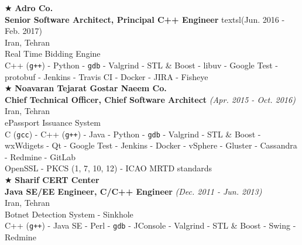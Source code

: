 \documentclass[10pt,a4paper]{article}
\begin{document}
\noindent $\bigstar$ \hspace{0.1cm} \large \textbf{Adro Co.} \\
\indent \small \textbf{Senior Software Architect, Principal C++ Engineer} textsl{(Jun. 2016 - Feb. 2017)} \\
\indent \textnormal{Iran, Tehran} \\
\indent \textbullet \hspace{0.05cm} Real Time Bidding Engine \\
\indent \textbullet \hspace{0.05cm} C++ (\texttt{g++}) - Python - \texttt{gdb} - Valgrind - STL \& Boost - libuv - Google Test - protobuf - Jenkins - Travis CI - Docker - JIRA - Fisheye \\

\noindent $\bigstar$ \hspace{0.1cm} \large \textbf{Noavaran Tejarat Gostar Naeem Co.} \\
\indent \small \textbf{Chief Technical Officer, Chief Software Architect} \textsl{(Apr. 2015 - Oct. 2016)} \\
\indent \textnormal{Iran, Tehran} \\
\indent \textbullet \hspace{0.05cm} ePassport Issuance System \\
\indent \textbullet \hspace{0.05cm} C (\texttt{gcc}) - C++ (\texttt{g++}) - Java - Python - \texttt{gdb} - Valgrind - STL \& Boost - wxWdigets - Qt - Google Test - Jenkins - Docker - vSphere - Gluster - Cassandra - Redmine - GitLab \\
\indent \textbullet \hspace{0.05cm} OpenSSL - PKCS (1, 7, 10, 12) - ICAO MRTD standards \\

\noindent $\bigstar$ \hspace{0.1cm} \large \textbf{Sharif CERT Center} \\ 
\indent \small \textbf{Java SE/EE Engineer, C/C++ Engineer} \textsl{(Dec. 2011 - Jun. 2013)} \\
\textnormal{Iran, Tehran} \\ 
\indent \textbullet \hspace{0.05cm} Botnet Detection System - Sinkhole \\
\indent \textbullet \hspace{0.05cm} C++ (\texttt{g++}) - Java SE - Perl - \texttt{gdb} - JConsole - Valgrind - STL \& Boost - Swing - Redmine \\
\end{document}
